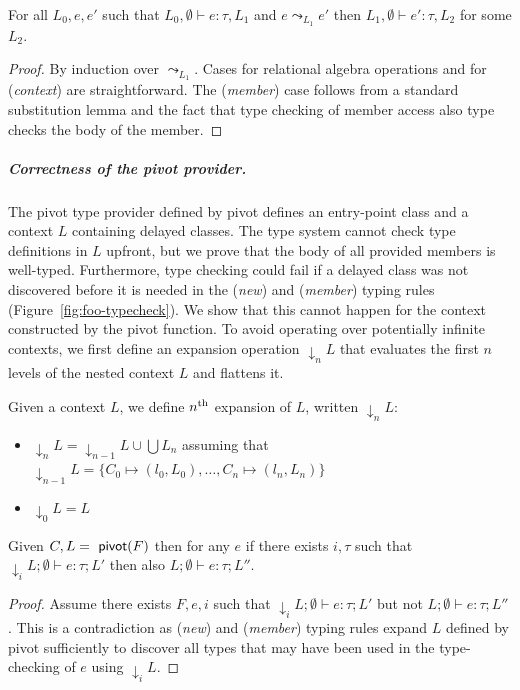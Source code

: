 \documentclass[a4paper,UKenglish]{lipics-v2016}
\theoremstyle{plain}
\theoremstyle{definition}
\newcommand{\ident}[1]{\textnormal{\sffamily #1}}
\begin{document}
\begin{lemma}
\label{thm:foo-pres}
For all $L_0, e, e'$ such that $L_0, \emptyset \vdash e : \tau, L_1$ and $e\leadsto_{L_1} e'$ then
$L_1, \emptyset \vdash e' : \tau, L_2$ for some $L_2$.
\end{lemma}
\begin{proof}
By induction over $\leadsto_{L_1}$. Cases for relational algebra operations and for (\emph{context})
are straightforward. The (\emph{member}) case follows from a standard substitution lemma and the 
fact that type checking of member access also type checks the body of the member.
\end{proof}

\subparagraph{Correctness of the pivot provider.} 
The pivot type provider defined by \ident{pivot} defines an entry-point class and a context $L$ 
containing delayed classes. The type system cannot check type definitions in $L$ upfront, but 
we prove that the body of all provided members is well-typed. Furthermore, type checking could fail
if a delayed class was not discovered before it is needed in the (\emph{new}) and (\emph{member}) 
typing rules (Figure~\ref{fig:foo-typecheck}). We show that this cannot happen for the context
constructed by the \ident{pivot} function. To avoid operating over potentially infinite contexts,
we first define an expansion operation $\downarrow_n L$ that evaluates the first $n$ levels of the 
nested context $L$ and flattens it.

\begin{definition}[Expansion]
\label{thm:pivot-well}
Given a context $L$, we define $n^{\textnormal{th}}$ expansion of $L$, written 
$\downarrow_n L$:
\begin{itemize}
\item $\downarrow_n L = \downarrow_{n-1} L \cup \bigcup L_n$ assuming that $\downarrow_{n-1} L = \{ C_0\mapsto(l_0, L_0),\ldots,C_n\mapsto(l_n, L_n) \}$
\item $\downarrow_0 L = L$  
\end{itemize}
\end{definition}

\begin{theorem}
\label{thm:pivot-lazy}
Given $C,L=\ident{pivot}(F)$ then for any $e$ if there exists $i, \tau$ such that 
$\downarrow_i L; \emptyset \vdash e : \tau; L'$ then also
$L; \emptyset \vdash e : \tau; L''$.
\end{theorem}
\begin{proof}
Assume there exists $F,e,i$ such that $\downarrow_i L; \emptyset \vdash e : \tau; L'$ but
not $L; \emptyset \vdash e : \tau; L''$. This is a contradiction as (\emph{new}) and (\emph{member})
typing rules expand $L$ defined by \ident{pivot} sufficiently to discover all types that may have
been used in the type-checking of $e$ using $\downarrow_i L$.
\end{proof}
\end{document}
